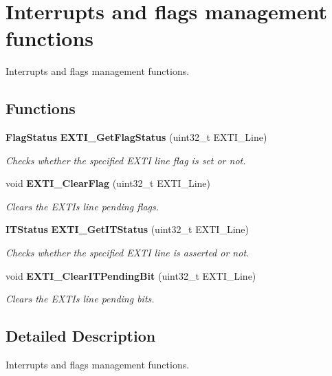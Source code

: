 \section{Interrupts and flags management functions}
\label{group__EXTI__Group2}


Interrupts and flags management functions.  


\subsection*{Functions}
\begin{DoxyCompactItemize}
\item 
\textbf{ Flag\+Status} \textbf{ E\+X\+T\+I\+\_\+\+Get\+Flag\+Status} (uint32\+\_\+t E\+X\+T\+I\+\_\+\+Line)
\begin{DoxyCompactList}\small\item\em Checks whether the specified E\+X\+TI line flag is set or not. \end{DoxyCompactList}\item 
void \textbf{ E\+X\+T\+I\+\_\+\+Clear\+Flag} (uint32\+\_\+t E\+X\+T\+I\+\_\+\+Line)
\begin{DoxyCompactList}\small\item\em Clears the E\+X\+TI\textquotesingle{}s line pending flags. \end{DoxyCompactList}\item 
\textbf{ I\+T\+Status} \textbf{ E\+X\+T\+I\+\_\+\+Get\+I\+T\+Status} (uint32\+\_\+t E\+X\+T\+I\+\_\+\+Line)
\begin{DoxyCompactList}\small\item\em Checks whether the specified E\+X\+TI line is asserted or not. \end{DoxyCompactList}\item 
void \textbf{ E\+X\+T\+I\+\_\+\+Clear\+I\+T\+Pending\+Bit} (uint32\+\_\+t E\+X\+T\+I\+\_\+\+Line)
\begin{DoxyCompactList}\small\item\em Clears the E\+X\+TI\textquotesingle{}s line pending bits. \end{DoxyCompactList}\end{DoxyCompactItemize}


\subsection{Detailed Description}
Interrupts and flags management functions. 

